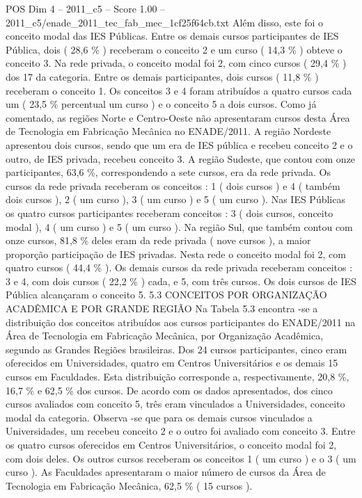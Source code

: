 \begin{textsample}{POS Dim 4 – 2011\_c5 – Score 1.00 – 2011\_c5/enade\_2011\_tec\_fab\_mec\_1cf25f64cb.txt}
Além disso, este foi o conceito modal das IES Públicas.
Entre os demais cursos participantes de IES Pública, dois ( 28,6 \% ) receberam o conceito 2 e um curso ( 14,3 \% ) obteve o conceito 3.
Na rede privada, o conceito modal foi 2, com cinco cursos ( 29,4 \% ) dos 17 da categoria.
Entre os demais participantes, dois cursos ( 11,8 \% ) receberam o conceito 1.
Os conceitos 3 e 4 foram atribuídos a quatro cursos cada um ( 23,5 \% percentual um curso ) e o conceito 5 a dois cursos.
Como já comentado, as regiões Norte e Centro-Oeste não apresentaram cursos desta Área de Tecnologia em Fabricação Mecânica no ENADE/2011.
A região Nordeste apresentou dois cursos, sendo que um era de IES pública e recebeu conceito 2 e o outro, de IES privada, recebeu conceito 3.
A região Sudeste, que contou com onze participantes, 63,6 \%, correspondendo a sete cursos, era da rede privada.
Os cursos da rede privada receberam os conceitos : 1 ( dois cursos ) e 4 ( também dois cursos ), 2 ( um curso ), 3 ( um curso ) e 5 ( um curso ).
Nas IES Públicas os quatro cursos participantes receberam conceitos : 3 ( dois cursos, conceito modal ), 4 ( um curso ) e 5 ( um curso ).
Na região Sul, que também contou com onze cursos, 81,8 \% deles eram da rede privada ( nove cursos ), a maior proporção participação de IES privadas.
Nesta rede o conceito modal foi 2, com quatro cursos ( 44,4 \% ).
Os demais cursos da rede privada receberam conceitos : 3 e 4, com dois cursos ( 22,2 \% ) cada, e 5, com três cursos.
Os dois cursos de IES Pública alcançaram o conceito 5. 5.3 CONCEITOS POR ORGANIZAÇÃO ACADÊMICA E POR GRANDE REGIÃO Na Tabela 5.3 encontra -se a distribuição dos conceitos atribuídos aos cursos participantes do ENADE/2011 na Área de Tecnologia em Fabricação Mecânica, por Organização Acadêmica, segundo as Grandes Regiões brasileiras.
Dos 24 cursos participantes, cinco eram oferecidos em Universidades, quatro em Centros Universitários e os demais 15 cursos em Faculdades.
Esta distribuição corresponde a, respectivamente, 20,8 \%, 16,7 \% e 62,5 \% dos cursos.
De acordo com os dados apresentados, dos cinco cursos avaliados com conceito 5, três eram vinculados a Universidades, conceito modal da categoria.
Observa -se que para os demais cursos vinculados a Universidades, um recebeu conceito 2 e o outro foi avaliado com conceito 3.
Entre os quatro cursos oferecidos em Centros Universitários, o conceito modal foi 2, com dois deles.
Os outros cursos receberam os conceitos 1 ( um curso ) e o 3 ( um curso ).
As Faculdades apresentaram o maior número de cursos da Área de Tecnologia em Fabricação Mecânica, 62,5 \% ( 15 cursos ).

\end{textsample}
